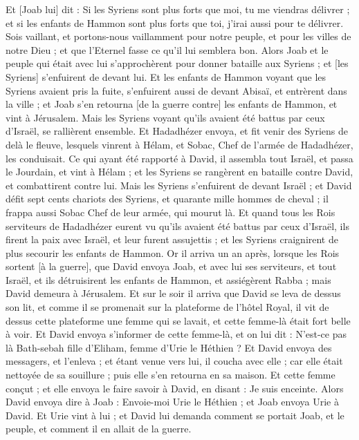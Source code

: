 \begin{multicols}{2}
Et [Joab lui] dit : Si les Syriens sont plus forts que moi, tu me viendras délivrer ; et si les enfants de Hammon sont plus forts que toi, j'irai aussi pour te délivrer.
Sois vaillant, et portons-nous vaillamment pour notre peuple, et pour les villes de notre Dieu ; et que l'Eternel fasse ce qu'il lui semblera bon.
Alors Joab et le peuple qui était avec lui s'approchèrent pour donner bataille aux Syriens ; et [les Syriens] s'enfuirent de devant lui.
Et les enfants de Hammon voyant que les Syriens avaient pris la fuite, s'enfuirent aussi de devant Abisaï, et entrèrent dans la ville ; et Joab s'en retourna [de la guerre contre] les enfants de Hammon, et vint à Jérusalem.
Mais les Syriens voyant qu'ils avaient été battus par ceux d'Israël, se rallièrent ensemble.
Et Hadadhézer envoya, et fit venir des Syriens de delà le fleuve, lesquels vinrent à Hélam, et Sobac, Chef de l'armée de Hadadhézer, les conduisait.
Ce qui ayant été rapporté à David, il assembla tout Israël, et passa le Jourdain, et vint à Hélam ; et les Syriens se rangèrent en bataille contre David, et combattirent contre lui.
Mais les Syriens s'enfuirent de devant Israël ; et David défit sept cents chariots des Syriens, et quarante mille hommes de cheval ; il frappa aussi Sobac Chef de leur armée, qui mourut là.
Et quand tous les Rois serviteurs de Hadadhézer eurent vu qu'ils avaient été battus par ceux d'Israël, ils firent la paix avec Israël, et leur furent assujettis ; et les Syriens craignirent de plus secourir les enfants de Hammon.
\VerseOne{}Or il arriva un an après, lorsque les Rois sortent [à la guerre], que David envoya Joab, et avec lui ses serviteurs, et tout Israël, et ils détruisirent les enfants de Hammon, et assiégèrent Rabba ; mais David demeura à Jérusalem.
Et sur le soir il arriva que David se leva de dessus son lit, et comme il se promenait sur la plateforme de l'hôtel Royal, il vit de dessus cette plateforme une femme qui se lavait, et cette femme-là était fort belle à voir.
Et David envoya s'informer de cette femme-là, et on lui dit : N'est-ce pas là Bath-sebah fille d'Eliham, femme d'Urie le Héthien ?
Et David envoya des messagers, et l'enleva ; et étant venue vers lui, il coucha avec elle ; car elle était nettoyée de sa souillure ; puis elle s'en retourna en sa maison.
Et cette femme conçut ; et elle envoya le faire savoir à David, en disant : Je suis enceinte.
Alors David envoya dire à Joab : Envoie-moi Urie le Héthien ; et Joab envoya Urie à David.
Et Urie vint à lui ; et David lui demanda comment se portait Joab, et le peuple, et comment il en allait de la guerre.

\end{multicols}

